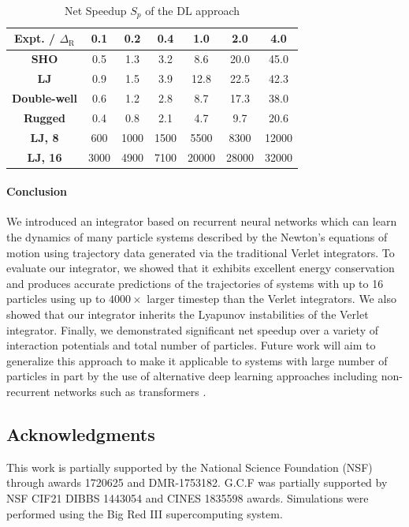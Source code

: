 \documentclass[aps,prl,twocolumn,superscriptaddress,tightenlines,longbibliography, reprint]{revtex4-1}
\newcommand{\dtR}{$\Delta_{\textrm{R}}$}
\begin{document}
\begin{table}[htbp]
\caption{Net Speedup $S_p$ of the DL approach}
\begin{center}
\begin{tabular}{|c|c|c|c|c|c|c|}
\hline
\textbf{Expt. / \dtR} & \textbf{0.1} & \textbf{0.2} & \textbf{0.4} & \textbf{1.0} & \textbf{2.0} & \textbf{4.0} \\
\hline
\textbf{SHO} & 0.5 & 1.3 & 3.2 & 8.6 & 20.0 & 45.0 \\
\hline
\textbf{LJ} & 0.9 & 1.5 & 3.9 & 12.8 & 22.5 & 42.3 \\
\hline
\textbf{Double-well} & 0.6 & 1.2 & 2.8 & 8.7 & 17.3 & 38.0 \\
\hline
\textbf{Rugged} & 0.4 & 0.8 & 2.1 & 4.7 & 9.7 & 20.6 \\
\hline
\textbf{LJ, 8} & 600 & 1000 & 1500 & 5500 & 8300 & 12000 \\
\hline
\textbf{LJ, 16} & 3000 & 4900 & 7100 & 20000 & 28000 & 32000 \\
\hline
\end{tabular}
\label{tab.ml.speedups}
\end{center}
\end{table}
\paragraph{Conclusion}
We introduced an integrator based on recurrent neural networks which can learn the dynamics of many particle systems described by the Newton's equations of motion using trajectory data generated via the traditional Verlet integrators. 
To evaluate our integrator, we showed that it exhibits excellent energy conservation and produces accurate predictions of the trajectories of systems with up to 16 particles using up to $4000 \times$ larger timestep than the Verlet integrators.
We also showed that our integrator inherits the Lyapunov instabilities of the Verlet integrator. Finally, we demonstrated significant net speedup over a variety of interaction potentials and total number of particles.
Future work will aim to generalize this approach to make it applicable to systems with large number of particles in part by the use of alternative deep learning approaches including non-recurrent networks such as transformers \cite{gcfref7}.

\subsection{Acknowledgments}
This work is partially supported by the National Science Foundation (NSF) through awards 1720625 and DMR-1753182. G.C.F was partially supported by NSF CIF21 DIBBS 1443054 and CINES 1835598 awards.
Simulations were performed using the Big Red III supercomputing system.
\end{document}
